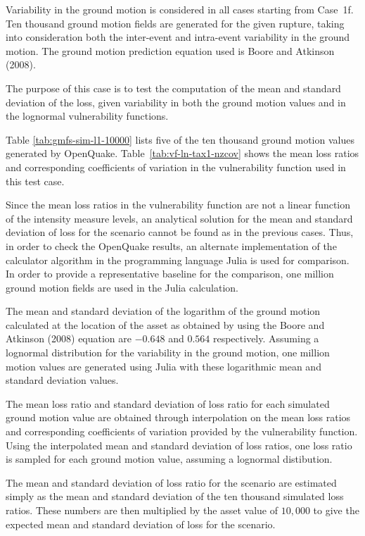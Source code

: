 Variability in the ground motion is considered in all cases starting from Case~1f. Ten thousand ground motion fields are generated for the given rupture, taking into consideration both the inter-event and intra-event variability in the ground motion. The ground motion prediction equation used is Boore and Atkinson (2008).

The purpose of this case is to test the computation of the mean and standard deviation of the loss, given variability in both the ground motion values and in the lognormal vulnerability functions.



Table \ref{tab:gmfs-sim-l1-10000} lists five of the ten thousand ground motion values generated by OpenQuake. Table~\ref{tab:vf-ln-tax1-nzcov} shows the mean loss ratios and corresponding coefficients of variation in the vulnerability function used in this test case.

Since the mean loss ratios in the vulnerability function are not a linear function of the intensity measure levels, an analytical solution for the mean and standard deviation of loss for the scenario cannot be found as in the previous cases. Thus, in order to check the OpenQuake results, an alternate implementation of the calculator algorithm in the programming language Julia is used for comparison. In order to provide a representative baseline for the comparison, one million ground motion fields are used in the Julia calculation.

The mean and standard deviation of the logarithm of the ground motion calculated at the location of the asset as obtained by using the Boore and Atkinson (2008) equation are $-0.648$ and $0.564$ respectively. Assuming a lognormal distribution for the variability in the ground motion, one million motion values are generated using Julia with these logarithmic mean and standard deviation values.

The mean loss ratio and standard deviation of loss ratio for each simulated ground motion value are obtained through interpolation on the mean loss ratios and corresponding coefficients of variation provided by the vulnerability function. Using the interpolated mean and standard deviation of loss ratios, one loss ratio is sampled for each ground motion value, assuming a lognormal distibution.

The mean and standard deviation of loss ratio for the scenario are estimated simply as the mean and standard deviation of the ten thousand simulated loss ratios. These numbers are then multiplied by the asset value of $10,000$ to give the expected mean and standard deviation of loss for the scenario.